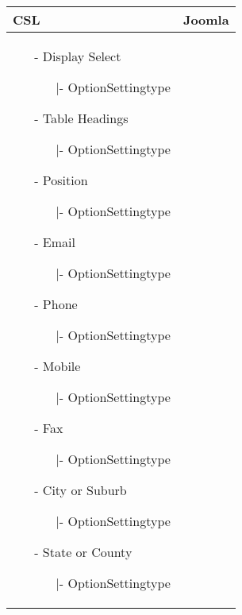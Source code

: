 \begin{minipage}{0.6\textwidth}
\begin{tabular}{|p{} | p{}|}
\hline
\textbf{CSL} & \textbf{Joomla} \\ 
\hline
\begin{itemize}
		\item[-] Display Select
		\begin{enumerate}
	   			\item[|-] OptionSettingtype
	   		\end{enumerate}  
		\item[-] Table Headings
		\begin{enumerate}
   			\item[|-] OptionSettingtype
   		\end{enumerate} 
		\item[-] Position
			\begin{enumerate}
		   			\item[|-] OptionSettingtype
		   		\end{enumerate} 
		\item[-] Email
			\begin{enumerate}
		   			\item[|-] OptionSettingtype
		   		\end{enumerate} 
		\item[-] Phone
			\begin{enumerate}
		   			\item[|-] OptionSettingtype
		   		\end{enumerate} 
		\item[-] Mobile
			\begin{enumerate}
		   			\item[|-] OptionSettingtype
		   		\end{enumerate} 
		\item[-] Fax
			\begin{enumerate}
		   			\item[|-] OptionSettingtype
		   		\end{enumerate} 
		\item[-] City or Suburb
			\begin{enumerate}
		   			\item[|-] OptionSettingtype
		   		\end{enumerate} 
		\item[-] State or County
			\begin{enumerate}
		   			\item[|-] OptionSettingtype

\end{enumerate}
\end{itemize}
\end{tabular}
\end{minipage}

